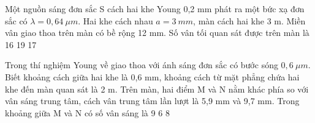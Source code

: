 \begin{vidu}%
Một nguồn sáng đơn sắc S cách hai khe Young 0,2 mm phát ra một bức xạ đơn sắc có $\lambda =0,64\ \mu m$. Hai khe cách nhau $a=3\ mm$, màn cách hai khe 3 m. Miền vân giao thoa trên màn có bề rộng 12 mm. Số vân tối quan sát được trên màn là
\choice
{16}
{}
{19}
{17}
\end{vidu} %
\begin{vidu}%
 Trong thí nghiệm Young về giao thoa với ánh sáng đơn sắc có bước sóng $0,6\ \mu m$. Biết khoảng cách giữa hai khe là 0,6 mm, khoảng cách từ mặt phẳng chứa hai khe đến màn quan sát là 2 m. Trên màn, hai điểm M và N nằm khác phía so với vân sáng trung tâm, cách vân trung tâm lần lượt là 5,9 mm và 9,7 mm. Trong khoảng giữa M và N có số vân sáng là
\choice
{9}
{}
{6}
{8}
\end{vidu} %
